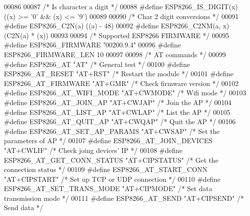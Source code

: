 \begin{DoxyCode}
00086 
00087 \textcolor{comment}{/* Is character a digit */}
00088 \textcolor{preprocessor}{#define ESP8266\_IS\_DIGIT(x)         ((x) >= '0' && (x) <= '9')}
00089 
00090 \textcolor{comment}{/* Char 2 digit conversions */}
00091 \textcolor{preprocessor}{#define ESP8266\_C2N(a)              ((a) - 48)}
00092 \textcolor{preprocessor}{#define ESP8266\_C2NM(a, x)          (C2N(a) * (x))}
00093 
00094 \textcolor{comment}{/* Supported ESP8266 FIRMWARE */}
00095 \textcolor{preprocessor}{#define ESP8266\_FIRMWARE            "00200.9.4"}
00096 \textcolor{preprocessor}{#define ESP8266\_FIRMWARE\_LEN        10}
00097 
00098 \textcolor{comment}{/* AT commands */}
00099 \textcolor{preprocessor}{#define ESP8266\_AT                  "AT"            }\textcolor{comment}{/* General test */}\textcolor{preprocessor}{}
00100 \textcolor{preprocessor}{#define ESP8266\_AT\_RESET            "AT+RST"        }\textcolor{comment}{/* Restart the module */}\textcolor{preprocessor}{}
00101 \textcolor{preprocessor}{#define ESP8266\_AT\_FIRMWARE         "AT+GMR"        }\textcolor{comment}{/* Check firmware version */}\textcolor{preprocessor}{}
00102 \textcolor{preprocessor}{#define ESP8266\_AT\_WIFI\_MODE        "AT+CWMODE"     }\textcolor{comment}{/* Wifi mode */}\textcolor{preprocessor}{}
00103 \textcolor{preprocessor}{#define ESP8266\_AT\_JOIN\_AP          "AT+CWJAP"      }\textcolor{comment}{/* Join the AP */}\textcolor{preprocessor}{}
00104 \textcolor{preprocessor}{#define ESP8266\_AT\_LIST\_AP          "AT+CWLAP"      }\textcolor{comment}{/* List the AP */}\textcolor{preprocessor}{}
00105 \textcolor{preprocessor}{#define ESP8266\_AT\_QUIT\_AP          "AT+CWQAP"      }\textcolor{comment}{/* Quit the AP */}\textcolor{preprocessor}{}
00106 \textcolor{preprocessor}{#define ESP8266\_AT\_SET\_AP\_PARAMS    "AT+CWSAP"      }\textcolor{comment}{/* Set the parameters of AP */}\textcolor{preprocessor}{}
00107 \textcolor{preprocessor}{#define ESP8266\_AT\_JOIN\_DEVICES     "AT+CWLIF"      }\textcolor{comment}{/* Check joing devices' IP */}\textcolor{preprocessor}{}
00108 \textcolor{preprocessor}{#define ESP8266\_AT\_GET\_CONN\_STATUS  "AT+CIPSTATUS"  }\textcolor{comment}{/* Get the connection status */}\textcolor{preprocessor}{}
00109 \textcolor{preprocessor}{#define ESP8266\_AT\_START\_CONN       "AT+CIPSTART"   }\textcolor{comment}{/* Set up TCP or UDP connection */}\textcolor{preprocessor}{}
00110 \textcolor{preprocessor}{#define ESP8266\_AT\_SET\_TRANS\_MODE   "AT+CIPMODE"    }\textcolor{comment}{/* Set data transmission mode */}\textcolor{preprocessor}{}
00111 \textcolor{preprocessor}{#define ESP8266\_AT\_SEND             "AT+CIPSEND"    }\textcolor{comment}{/* Send data */}\textcolor{preprocessor}{}

\end{DoxyCode}
